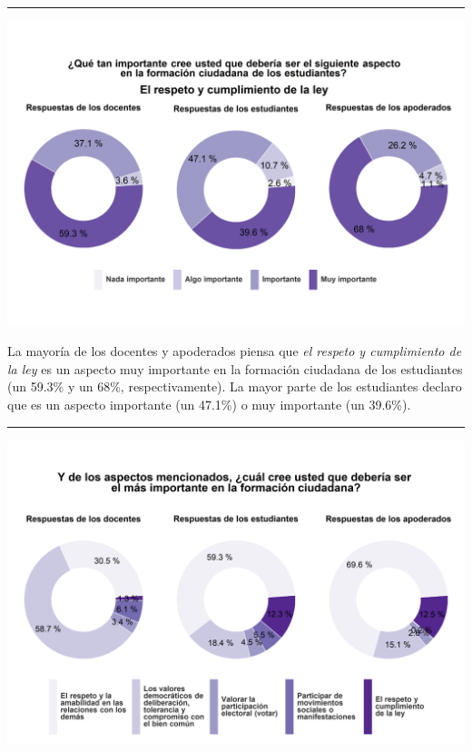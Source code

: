 \documentclass[
  14pt,
]{book}
\let\origfigure\figure
\let\endorigfigure\endfigure
\renewenvironment{figure}[1][2] {
  \expandafter\origfigure\expandafter[H]
} {
  \endorigfigure
}
\begin{document}
\begin{center}\rule{0.5\linewidth}{0.5pt}\end{center}

\begin{figure}[!ht]

{\centering \includegraphics[width=0.8\linewidth,]{images/graph_for_ciud5} 

}

\caption{Relevancia del cumplimiento de la ley}\label{fig:unnamed-chunk-29}
\end{figure}

La mayoría de los docentes y apoderados piensa que \emph{el respeto y cumplimiento de la ley} es un aspecto muy importante en la formación ciudadana de los estudiantes (un 59.3\% y un 68\%, respectivamente). La mayor parte de los estudiantes declaro que es un aspecto importante (un 47.1\%) o muy importante (un 39.6\%).

\begin{center}\rule{0.5\linewidth}{0.5pt}\end{center}

\begin{figure}[!ht]

{\centering \includegraphics[width=0.8\linewidth,]{images/graph_for_ciud6} 

}

\caption{Aspecto más relevante en la formación ciudadana}\label{fig:unnamed-chunk-30}
\end{figure}
\end{document}

